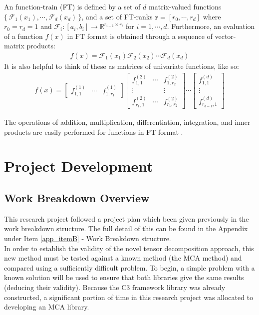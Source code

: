 \documentclass[11pt,draftd]{article}
\begin{document}
An function-train (FT) is defined by a set of $ d $ matrix-valued functions $ \{\, \mathcal{F}_{1}(x_{1}),\cdots,\mathcal{F}_{d}(x_{d}) \,\} $, and a set of FT-ranks $ \bm{r} = [r_{0},\cdots,r_{d}] $ where $ r_{0} = r_{d} = 1 $ and $ \mathcal{F}_{i} : [a_{i}, b_{i}] \rightarrow \mathbb{R}^{r_{i-1}\times r_{i}} $ for $ i = 1, \cdots, d $. Furthermore, an evaluation of a function $ f (x) $ in FT format is obtained through a sequence of vector-matrix products:
\begin{align*}
	f(x) = \mathcal{F}_{1}(x_{1})\mathcal{F}_{2}(x_{2}) \cdots \mathcal{F}_{d}(x_{d}) 
\end{align*}
It is also helpful to think of these as matrices of univariate functions, like so:
\begin{align}
	f(x) = \begin{bmatrix}
	f_{1,1}^{(1)} & \cdots & f_{1,r_{1}}^{(1)}
	\end{bmatrix}
	\begin{bmatrix}
	f_{1,1}^{(2)} & \cdots & f_{1,r_{2}}^{(2)} \\
	\vdots & & \vdots \\
	f_{r_{1},1}^{(2)} & \cdots & f_{r_{1},r_{2}}^{(2)}
	\end{bmatrix} 
	\cdots
	\begin{bmatrix}
	f_{1,1}^{(d)} \\
	\vdots \\
	f_{r_{d-1},1}^{(d)}
	\end{bmatrix}
\end{align}

The operations of addition, multiplication, differentiation, integration, and inner products are easily performed for functions in FT format \cite{thesis}. 
\newpage

\section{Project Development} \label{ProjectProgress}
\subsection{Work Breakdown Overview}
This research project followed a project plan which been given previously in the work breakdown structure. The full detail of this can be found in the Appendix under Item \ref{app_itemB} - Work Breakdown structure. \\

In order to establish the validity of the novel tensor decomposition approach, this new method must be tested against a known method (the MCA method) and compared using a sufficiently difficult problem. To begin, a simple problem with a known solution will be used to ensure that both libraries give the same results (deducing their validity). Because the C3 framework library was already constructed, a significant portion of time in this research project was allocated to developing an MCA library. \\
\end{document}
